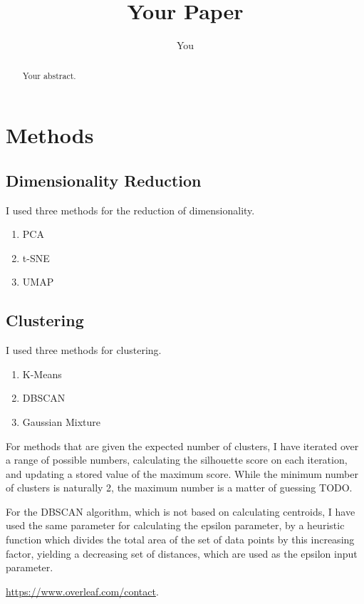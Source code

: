 \documentclass{article}
\title{Your Paper}
\author{You}
\begin{document}
\maketitle

\begin{abstract}
Your abstract.
\end{abstract}

\section{Methods}
\subsection{Dimensionality Reduction}
I used three methods for the reduction of dimensionality.
\begin{enumerate}
    \item PCA
    \item t-SNE
    \item UMAP
\end{enumerate}

\subsection{Clustering}
I used three methods for clustering.
\begin{enumerate}
    \item K-Means
    \item DBSCAN
    \item Gaussian Mixture
\end{enumerate}

For methods that are given the expected number of clusters, I have iterated over a range of possible numbers, calculating the silhouette score on each iteration, and updating a stored value of the maximum score. While the minimum number of clusters is naturally 2, the maximum number is a matter of guessing TODO.

For the DBSCAN algorithm, which is not based on calculating centroids, I have used the same parameter for calculating the epsilon parameter, by a heuristic function which divides the total area of the set of data points by this increasing factor, yielding a decreasing set of distances, which are used as the epsilon input parameter.  

\url{https://www.overleaf.com/contact}.



\end{document}
